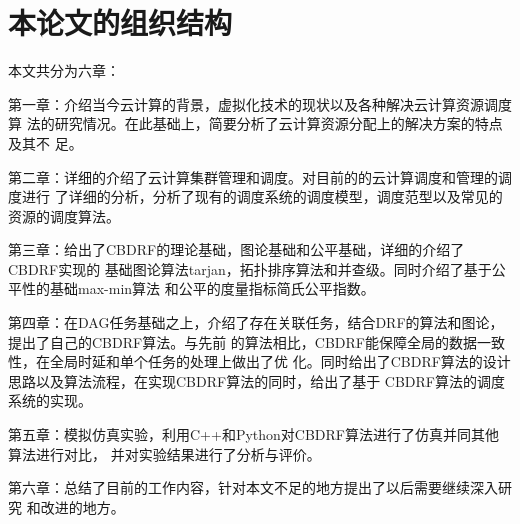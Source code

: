 \section{本论文的组织结构}
本文共分为六章：

第一章：介绍当今云计算的背景，虚拟化技术的现状以及各种解决云计算资源调度算
法的研究情况。在此基础上，简要分析了云计算资源分配上的解决方案的特点及其不
足。

第二章：详细的介绍了云计算集群管理和调度。对目前的的云计算调度和管理的调度进行
了详细的分析，分析了现有的调度系统的调度模型，调度范型以及常见的资源的调度算法。

第三章：给出了CBDRF的理论基础，图论基础和公平基础，详细的介绍了CBDRF实现的
基础图论算法tarjan，拓扑排序算法和并查级。同时介绍了基于公平性的基础max-min算法
和公平的度量指标简氏公平指数。

第四章：在DAG任务基础之上，介绍了存在关联任务，结合DRF的算法和图论，提出了自己的CBDRF算法。与先前
的算法相比，CBDRF能保障全局的数据一致性，在全局时延和单个任务的处理上做出了优
化。同时给出了CBDRF算法的设计思路以及算法流程，在实现CBDRF算法的同时，给出了基于
CBDRF算法的调度系统的实现。

第五章：模拟仿真实验，利用C++和Python对CBDRF算法进行了仿真并同其他算法进行对比，
并对实验结果进行了分析与评价。

第六章：总结了目前的工作内容，针对本文不足的地方提出了以后需要继续深入研究
和改进的地方。

